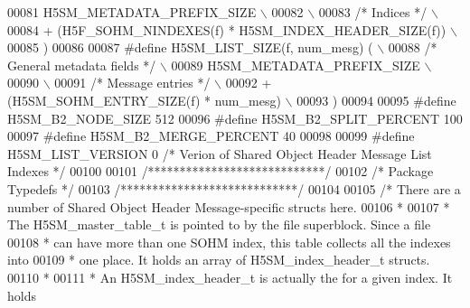 \begin{DoxyCode}
00081 \textcolor{preprocessor}{    H5SM\_METADATA\_PREFIX\_SIZE                                                 \(\backslash\)}
00082 \textcolor{preprocessor}{                                                                              \(\backslash\)}
00083 \textcolor{preprocessor}{    }\textcolor{comment}{/* Indices */}\textcolor{preprocessor}{                                                             \(\backslash\)}
00084 \textcolor{preprocessor}{    + (H5F\_SOHM\_NINDEXES(f) * H5SM\_INDEX\_HEADER\_SIZE(f))                      \(\backslash\)}
00085 \textcolor{preprocessor}{    )}
00086 
00087 \textcolor{preprocessor}{#define H5SM\_LIST\_SIZE(f, num\_mesg) (                                         \(\backslash\)}
00088 \textcolor{preprocessor}{    }\textcolor{comment}{/* General metadata fields */}\textcolor{preprocessor}{                                             \(\backslash\)}
00089 \textcolor{preprocessor}{    H5SM\_METADATA\_PREFIX\_SIZE                                                 \(\backslash\)}
00090 \textcolor{preprocessor}{                                                                              \(\backslash\)}
00091 \textcolor{preprocessor}{    }\textcolor{comment}{/* Message entries */}\textcolor{preprocessor}{                                                     \(\backslash\)}
00092 \textcolor{preprocessor}{    + (H5SM\_SOHM\_ENTRY\_SIZE(f) * num\_mesg)                                    \(\backslash\)}
00093 \textcolor{preprocessor}{    )}
00094 
00095 \textcolor{preprocessor}{#define H5SM\_B2\_NODE\_SIZE 512}
00096 \textcolor{preprocessor}{#define H5SM\_B2\_SPLIT\_PERCENT 100}
00097 \textcolor{preprocessor}{#define H5SM\_B2\_MERGE\_PERCENT 40}
00098 
00099 \textcolor{preprocessor}{#define H5SM\_LIST\_VERSION   0   }\textcolor{comment}{/* Verion of Shared Object Header Message List Indexes */}\textcolor{preprocessor}{}
00100 
00101 \textcolor{comment}{/****************************/}
00102 \textcolor{comment}{/* Package Typedefs         */}
00103 \textcolor{comment}{/****************************/}
00104 
00105 \textcolor{comment}{/* There are a number of Shared Object Header Message-specific structs here.}
00106 \textcolor{comment}{ *}
00107 \textcolor{comment}{ * The H5SM\_master\_table\_t is pointed to by the file superblock.  Since a file}
00108 \textcolor{comment}{ * can have more than one SOHM index, this table collects all the indexes into}
00109 \textcolor{comment}{ * one place.  It holds an array of H5SM\_index\_header\_t structs.}
00110 \textcolor{comment}{ *}
00111 \textcolor{comment}{ * An H5SM\_index\_header\_t is actually the for a given index.  It holds}

\end{DoxyCode}
